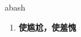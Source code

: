 
\begin{frame}
{\huge abash}
\begin{center}
\begin{enumerate}\Large
  \item \textbf{使尴尬，使羞愧}
\end{enumerate}
\end{center}
\end{frame}
